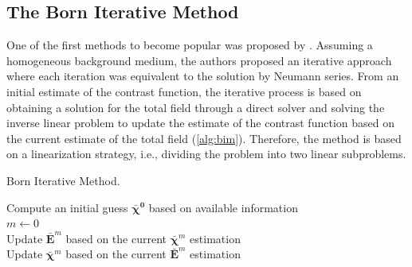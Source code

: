 		\subsection{The Born Iterative Method}\label{chap:methods:deterministic:bim}
					
			One of the first methods to become popular was proposed by \cite{wang1989iterative}. Assuming a homogeneous background medium, the authors proposed an iterative approach where each iteration was equivalent to the solution by Neumann series. From an initial estimate of the contrast function, the iterative process is based on obtaining a solution for the total field through a direct solver and solving the inverse linear problem to update the estimate of the contrast function based on the current estimate of the total field (\autoref{alg:bim}). Therefore, the method is based on a linearization strategy, i.e., dividing the problem into two linear subproblems.
			
			\begin{algorithm}[!htb]
				\caption{Born Iterative Method.}
				\label{alg:bim}
				Compute an initial guess $\boldsymbol{\bar{\chi}^0}$ based on available information \\
				$m\leftarrow0$ \\
				 {
					Update $\mathbf{\bar{E}}^m$ based on the current $\boldsymbol{\bar{\chi}}^m$ estimation \\
					Update $\boldsymbol{\bar{\chi}}^m$ based on the current $\mathbf{\bar{E}}^m$ estimation \\
				}
			\end{algorithm}
		
